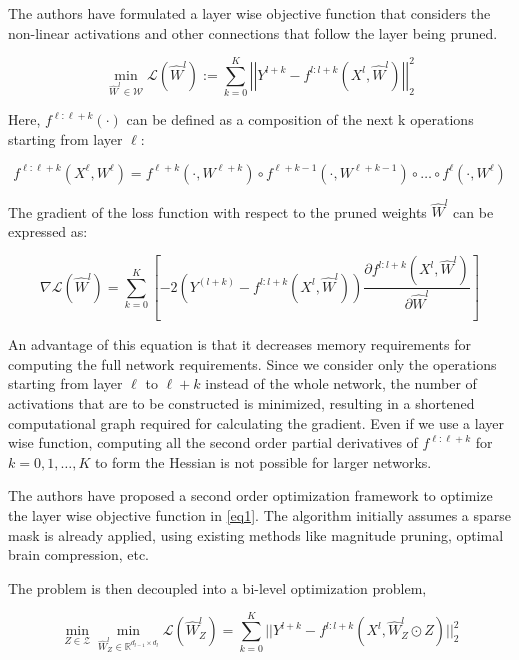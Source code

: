 \documentclass[11pt]{extreport}
\begin{document}
		The authors have formulated a layer wise objective function that considers the non-linear activations and other connections that follow the layer being pruned.

		\begin{equation} \label{eq1}
			\min_{\widehat{W}^l \in \mathcal{W}} \mathcal{L}(\widehat{W}^l) := \sum_{k=0}^{K} \left\lvert\left\lvert Y^{l+k} - f^{l:l+k}(X^l, \widehat{W}^l)\right\rvert\right\rvert_2^2
		\end{equation}


		Here, \(f^{\ell:\ell + k}(\cdot) \) can be defined as a composition of the next k operations starting from layer \(\ell\):

		$$f^{\ell:\ell + k}(X^{\ell},W^{\ell}) = f^{\ell + k}(\cdot, W^{\ell + k}) \circ f^{\ell + k - 1}(\cdot, W^{\ell + k - 1}) \circ \ldots \circ f^{\ell}(\cdot, W^{\ell}) $$ 

		The gradient of the loss function with respect to the pruned weights \(\widehat{W}^l\) can be expressed as:

		\begin{equation} \label{eq2}
			\nabla \mathcal{L}(\widehat{W}^l) = \sum_{k=0}^{K} \left[ -2(Y^(l+k) - f^{l:l+k}(X^l, \widehat{W}^l))\frac{\partial f^{l:l+k}(X^l,\widehat{W}^l)}{\partial \widehat{W}^l} \right]
		\end{equation}


		An advantage of this equation is that it decreases memory requirements for computing the full network requirements. Since we consider only the operations starting from layer \(\ell\) to \(\ell + k\) instead of the whole network, the number of activations that are to be constructed is minimized, resulting in a shortened computational graph required for calculating the gradient. Even if we use a layer wise function, computing all the second order partial derivatives of \(f^{\ell: \ell+k}\) for \(k = 0, 1, \ldots, K\) to form the Hessian is not possible for larger networks.

		The authors have proposed a second order optimization framework to optimize the layer wise objective function in \ref{eq1}. The algorithm initially assumes a sparse mask is already applied, using existing methods like magnitude pruning, optimal brain compression, etc. 

		The problem is then decoupled into a bi-level optimization problem,

		\begin{equation} \label{eq3}
			\min_{Z \in \mathcal{Z}} \min_{\widehat{W}_Z^l \in \mathbb{R}^{d_{l-1} \times d_l}} \mathcal{L}(\widehat{W}_Z^l) = \sum_{k=0}^{K} ||Y^{l+k} - f^{l:l+k}(X^l, \widehat{W}_Z^l \odot Z)||_2^2
		\end{equation}
\end{document}
